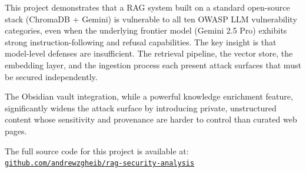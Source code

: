 \documentclass[12pt, a4paper]{report}
\begin{document}
This project demonstrates that a RAG system built on a standard open-source stack
(ChromaDB + Gemini) is vulnerable to all ten OWASP LLM vulnerability categories, even when
the underlying frontier model (Gemini 2.5 Pro) exhibits strong instruction-following and
refusal capabilities. The key insight is that model-level defenses are insufficient. The retrieval pipeline, the vector store, the embedding layer, and the ingestion process each
present attack surfaces that must be secured independently.

The Obsidian vault integration, while a powerful knowledge enrichment feature, significantly
widens the attack surface by introducing private, unstructured content whose sensitivity and
provenance are harder to control than curated web pages.

\vspace{1em}
The full source code for this project is available at:\\
\href{https://github.com/andrewzgheib/rag-security-analysis}{\texttt{github.com/andrewzgheib/rag-security-analysis}}
\end{document}
